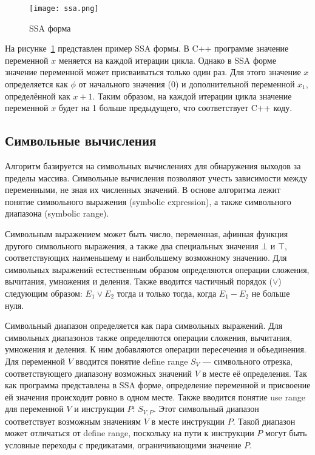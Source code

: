 \begin{figure}
    \texttt{[image: ssa.png]}
    \caption{SSA форма}
    \label{fig:ssa}
\end{figure}

На рисунке~\ref{fig:ssa} представлен пример SSA формы. В C++ программе
значение переменной $x$ меняется на каждой итерации цикла. Однако в
SSA форме значение переменной может присваиваться только один раз. Для
этого значение $x$ определяется как $\phi$ от начального значения
($0$) и дополнительной переменной $x_1$, определённой как $x +
1$. Таким образом, на каждой итерации цикла значение переменной $x$
будет на 1 больше предыдущего, что соответствует C++ коду.

\subsection{Символьные вычисления}

Алгоритм базируется на символьных вычислениях для обнаружения выходов
за пределы массива. Символьные вычисления позволяют учесть зависимости
между переменными, не зная их численных значений. В основе алгоритма
лежит понятие символьного выражения (symbolic expression), а также
символьного диапазона (symbolic range).

Символьным выражением может быть число, переменная, афинная функция
другого символьного выражения, а также два специальных значения $\bot$
и $\top$, соответствующих наименьшему и наибольшему возможному
значению. Для символьных выражений естественным образом определяются
операции сложения, вычитания, умножения и деления. Также вводится
частичный порядок ($\vee$) следующим образом: $E_1 \vee E_2$ тогда и
только тогда, когда $E_1 - E_2$ не больше нуля.

Символьный диапазон определяется как пара символьных выражений. Для
символьных диапазонов также определяются операции сложения, вычитания,
умножения и деления. К ним добавляются операции пересечения и
объединения. Для переменной $V$ вводится понятие define range $S_V$
--- символьного отрезка, соответствующего диапазону возможных значений
$V$ в месте её определения. Так как программа представлена в SSA
форме, определение переменной и присвоение ей значения происходит
ровно в одном месте. Также вводится понятие use range для переменной
$V$ и инструкции $P$: $S_{V,P}$. Этот символьный диапазон
соответствует возможным значениям $V$ в месте инструкции $P$. Такой
диапазон может отличаться от define range, поскольку на пути к
инструкции $P$ могут быть условные переходы с предикатами,
ограничивающими значение $P$.

